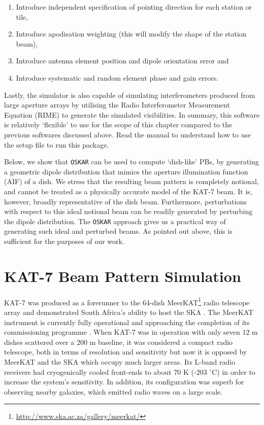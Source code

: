 \begin{enumerate}[label=(\roman*)]
 \item Introduce independent specification of pointing direction for each station or tile,
 \item Introduce apodisation weighting (this will modify the shape of the station beam),
 \item Introduce antenna element position and dipole orientation error and 
 \item Introduce systematic and random element phase and gain errors.
\end{enumerate}

\noindent Lastly, the simulator is also capable of simulating interferometers produced from large aperture arrays by utilising 
the Radio Interferometer Measurement Equation (RIME) \citep{1996A&AS..117..137H,2011A&A...527A.106S} to generate the simulated visibilities. 
In summary, this software is relatively \enquote*{flexible}  to use for the scope of this chapter compared to the previous softwares discussed above. 
Read the manual to understand how to use the setup file to run this package. 

Below, we show that {\tt OSKAR} can be used to compute \enquote*{dish-like} 
PBs, by generating a geometric dipole distribution that mimics the
aperture illumination function (AIF) of a dish. We stress that the
resulting beam pattern is completely notional, and cannot be treated
as a physically accurate model of the KAT-7 beam. It is, however,
broadly representative of the dish beam. Furthermore, perturbations
with respect to this ideal notional beam can be readily generated
by perturbing the dipole distribution. The {\tt OSKAR} approach gives us
a practical way of generating such ideal and perturbed beams. As
pointed out above, this is sufficient for the purposes of our work.

% 
\section{KAT-7 Beam Pattern Simulation}	   \label{sec:oskar-bm}
 KAT-7 was produced as a forerunner to the 64-dish  MeerKAT\footnote{\url{ http://www.ska.ac.za/gallery/meerkat/}} radio telescope array and demonstrated 
South Africa's ability to host the SKA \citep{woudt2013early}. The MeerKAT instrument is currently fully operational and approaching the completion 
of its commissioning programme \citep{booth2012overview,foley2016engineering}.
When KAT-7 was in operation with only seven $12$ m dishes scattered over a $200$ m baseline, it was considered a compact radio telescope,  both in terms of resolution and sensitivity
but now it is opposed by MeerKAT and the SKA which occupy much larger areas. Its L-band radio receivers had cryogenically cooled front-ends to about $70$ K (-203 $^{\circ}$C) 
in order to increase the system's sensitivity. In addition, its configuration was superb for observing nearby galaxies, which emitted radio waves on a large scale.

